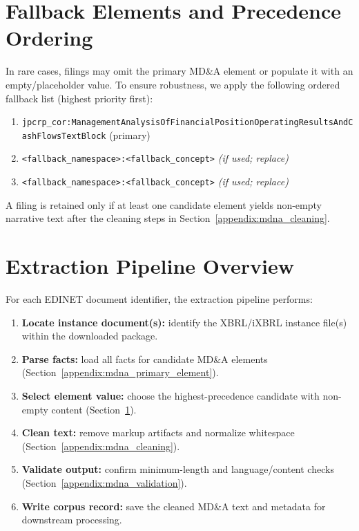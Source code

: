 \section{Fallback Elements and Precedence Ordering}
\label{appendix:mdna_fallbacks}

In rare cases, filings may omit the primary MD\&A element or populate it with an empty/placeholder value. To ensure robustness, we apply the following ordered fallback list (highest priority first):

\begin{enumerate}
  \item \texttt{jpcrp\_cor:ManagementAnalysisOfFinancialPositionOperatingResultsAndCashFlowsTextBlock} (primary)
  \item \texttt{<fallback\_namespace>:<fallback\_concept>} \hfill \emph{(if used; replace)}
  \item \texttt{<fallback\_namespace>:<fallback\_concept>} \hfill \emph{(if used; replace)}
\end{enumerate}

\noindent A filing is retained only if at least one candidate element yields non-empty narrative text after the cleaning steps in Section~\ref{appendix:mdna_cleaning}.

\section{Extraction Pipeline Overview}
\label{appendix:mdna_pipeline_overview}

For each EDINET document identifier, the extraction pipeline performs:

\begin{enumerate}
  \item \textbf{Locate instance document(s):} identify the XBRL/iXBRL instance file(s) within the downloaded package.
  \item \textbf{Parse facts:} load all facts for candidate MD\&A elements (Section~\ref{appendix:mdna_primary_element}).
  \item \textbf{Select element value:} choose the highest-precedence candidate with non-empty content (Section~\ref{appendix:mdna_fallbacks}).
  \item \textbf{Clean text:} remove markup artifacts and normalize whitespace (Section~\ref{appendix:mdna_cleaning}).
  \item \textbf{Validate output:} confirm minimum-length and language/content checks (Section~\ref{appendix:mdna_validation}).
  \item \textbf{Write corpus record:} save the cleaned MD\&A text and metadata for downstream processing.
\end{enumerate}

